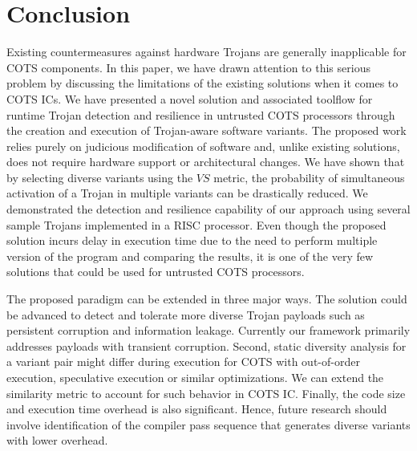 \documentclass[conference]{IEEEtran}
\begin{document}

\section{Conclusion}
\label{sec:conc}
Existing countermeasures against hardware Trojans are generally inapplicable for COTS components.
In this paper, we have drawn attention to this serious problem by discussing the limitations of the existing solutions when it comes to COTS ICs. We have presented a novel solution and associated toolflow for runtime Trojan detection and resilience in untrusted COTS processors through the creation and execution of Trojan-aware software variants. The proposed work relies purely on judicious modification of software and, unlike existing solutions, does not require hardware support or architectural changes. We have shown that by selecting diverse variants using the $VS$ metric, the probability of simultaneous activation of a Trojan in multiple variants can be drastically reduced. We demonstrated the detection and resilience capability of our approach using several sample Trojans implemented in a RISC processor. Even though the proposed solution incurs delay in execution time due to the need to perform multiple version of the program and comparing the results, it is one of the very few solutions that could be used for untrusted COTS processors. 

The proposed paradigm can be extended in three major ways. The solution could be advanced to detect and tolerate more diverse Trojan payloads such as persistent corruption and information leakage. Currently our framework primarily addresses payloads with transient corruption. Second, static diversity analysis for a variant pair might differ during execution for COTS with out-of-order execution, speculative execution or similar optimizations. We can extend the similarity metric to account for such behavior in COTS IC.     
Finally, the code size and execution time overhead is also significant.  %
Hence, future research should involve identification of the compiler pass sequence that generates diverse variants with lower overhead.     
\end{document}
